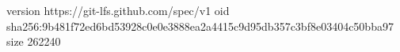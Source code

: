 version https://git-lfs.github.com/spec/v1
oid sha256:9b481f72ed6bd53928c0e0e3888ea2a4415c9d95db357c3bf8e03404c50bba97
size 262240
